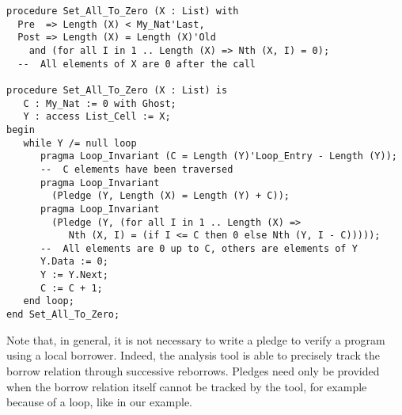 \documentclass[runningheads]{llncs}
\begin{document}
\begin{lstlisting}
procedure Set_All_To_Zero (X : List) with
  Pre  => Length (X) < My_Nat'Last,
  Post => Length (X) = Length (X)'Old
    and (for all I in 1 .. Length (X) => Nth (X, I) = 0);
  --  All elements of X are 0 after the call

procedure Set_All_To_Zero (X : List) is
   C : My_Nat := 0 with Ghost;
   Y : access List_Cell := X;
begin
   while Y /= null loop
      pragma Loop_Invariant (C = Length (Y)'Loop_Entry - Length (Y));
      --  C elements have been traversed
      pragma Loop_Invariant
        (Pledge (Y, Length (X) = Length (Y) + C));
      pragma Loop_Invariant
        (Pledge (Y, (for all I in 1 .. Length (X) =>
           Nth (X, I) = (if I <= C then 0 else Nth (Y, I - C)))));
      --  All elements are 0 up to C, others are elements of Y
      Y.Data := 0;
      Y := Y.Next;
      C := C + 1;
   end loop;
end Set_All_To_Zero;
\end{lstlisting}
Note that, in general, it is not necessary to write a pledge to verify a program using a local borrower. Indeed, the analysis tool is able to precisely track the borrow relation through successive reborrows. Pledges need only be provided when the borrow relation itself cannot be tracked by the tool, for example because of a loop, like in our example.

\end{document}
